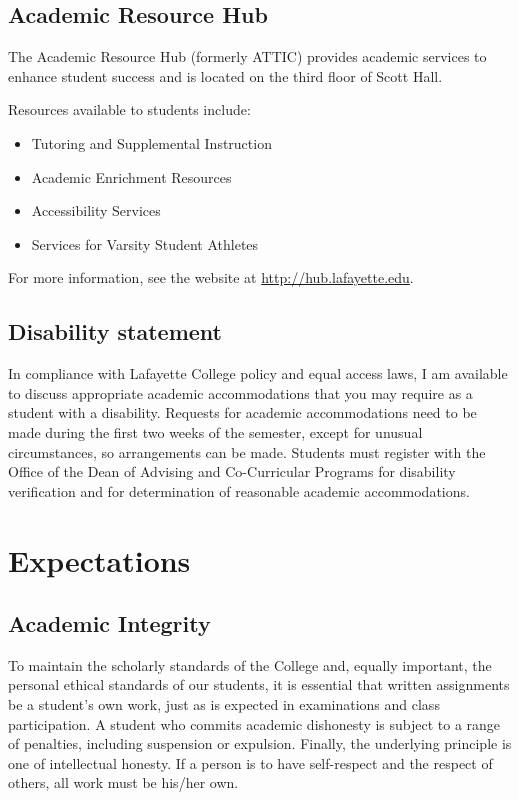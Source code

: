 \documentclass[12pt]{amsart}
\begin{document}
\subsection*{Academic Resource Hub}
\noindent
The Academic Resource Hub (formerly ATTIC) provides academic services to enhance student success and is located on the third floor of Scott Hall.

Resources available to students include:
\begin{itemize}
\item 
  Tutoring and Supplemental Instruction
\item
  Academic Enrichment Resources
\item
  Accessibility Services
\item
  Services for Varsity Student Athletes
\end{itemize}
For more information, see the website at \url{http://hub.lafayette.edu}.

\subsection*{Disability statement}
In compliance with Lafayette College policy and equal access laws, I am available to discuss appropriate academic accommodations that you may require as a student with a disability.  Requests for academic accommodations need to be made during the first two weeks of the semester, except for unusual circumstances, so arrangements can be made.  Students must register with the Office of the Dean of Advising and Co-Curricular Programs for disability verification and for determination of reasonable academic accommodations.


\section*{Expectations}
\noindent
\subsection*{Academic Integrity}
To maintain the scholarly standards of the College and, equally important, the personal ethical standards of our students, it is essential that written assignments be a student’s own work, just as is expected in examinations and class participation. A student who commits academic dishonesty is subject to a range of penalties, including suspension or expulsion. Finally, the underlying principle is one of intellectual honesty. If a person is to have self-respect and the respect of others, all work must be his/her own.
\end{document}
